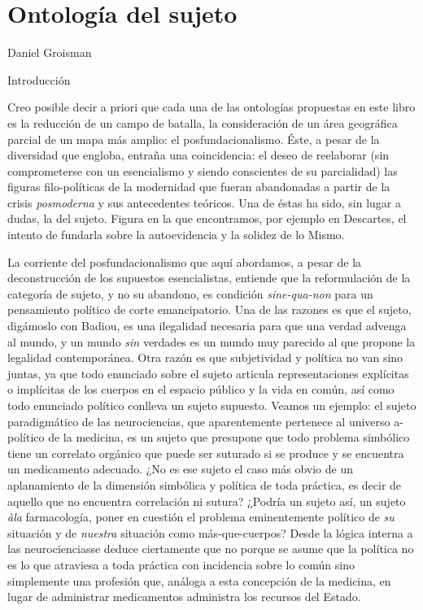\chapter{Ontología del sujeto}

Daniel Groisman

{Introducción}


Creo posible decir a priori que cada una de las ontologías propuestas en este libro es la reducción de un campo de batalla, la consideración de un área geográfica parcial de un mapa más amplio: el posfundacionalismo. Éste, a pesar de la diversidad que engloba, entraña una coincidencia: el deseo de reelaborar (sin comprometerse con un esencialismo y siendo conscientes de su parcialidad) las figuras filo-políticas de la modernidad que fueran abandonadas a partir de la crisis \emph{posmoderna} y sus antecedentes teóricos. Una de éstas ha sido, sin lugar a dudas, la del sujeto. Figura en la que encontramos, por ejemplo en Descartes, el intento de fundarla sobre la autoevidencia y la solidez de lo Mismo.

La corriente del posfundacionalismo que aquí abordamos, a pesar de la deconstrucción de los supuestos esencialistas, entiende que la reformulación de la categoría de sujeto, y no su abandono, es condición \emph{sine-qua-non} para un pensamiento político de corte emancipatorio. Una de las razones es que el sujeto, digámoslo con Badiou, es una ilegalidad necesaria para que una verdad advenga al mundo, y un mundo \emph{sin} verdades es un mundo muy parecido al que propone la legalidad contemporánea. Otra razón es que subjetividad y política no van sino juntas, ya que todo enunciado sobre el sujeto articula representaciones explícitas o implícitas de los cuerpos en el espacio público y la vida en común, así como todo enunciado político conlleva un sujeto supuesto. Veamos un ejemplo: el sujeto paradigmático de las neurociencias, que aparentemente pertenece al universo a-político de la medicina, es un sujeto que presupone que todo problema simbólico tiene un correlato orgánico que puede ser suturado si se produce y se encuentra un medicamento adecuado. ¿No es ese sujeto el caso más obvio de un aplanamiento de la dimensión simbólica y política de toda práctica, es decir de aquello que no encuentra correlación ni sutura? ¿Podría un sujeto así, un sujeto \emph{àla} farmacología, poner en cuestión el problema eminentemente político de \emph{su} situación y de \emph{nuestra} situación como más-que-cuerpos? Desde la lógica interna a las neurocienciasse deduce ciertamente que no porque se asume que la política no es lo que atraviesa a toda práctica con incidencia sobre lo común sino simplemente una profesión que, análoga a esta concepción de la medicina, en lugar de administrar medicamentos administra los recursos del Estado.

